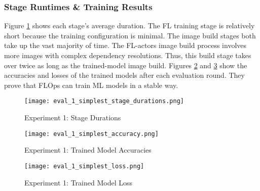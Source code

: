 \subsubsection{Stage Runtimes \& Training Results}
Figure \ref{fig:eval_1_simplest_stage_durations} shows each stage's average duration.
The FL training stage is relatively short because the training configuration is minimal.
The image build stages both take up the vast majority of time.
The FL-actors image build process involves more images with complex dependency resolutions.
Thus, this build stage takes over twice as long as the trained-model image build.
Figures \ref{fig:eval_1_simplest_accuracies} and \ref{fig:eval_1_simplest_loss} show the accuracies and losses of the trained models after each evaluation round.
They prove that FLOps can train ML models in a stable way.

\begin{figure}[H]
    \begin{adjustwidth}{-0.2\paperwidth}{-0.2\paperwidth}
        \centering
        \texttt{[image: eval\_1\_simplest\_stage\_durations.png]}
        \caption{Experiment 1: Stage Durations}
        \label{fig:eval_1_simplest_stage_durations}
    \end{adjustwidth}
\end{figure}

\begin{figure}[H]
    \centering
    \texttt{[image: eval\_1\_simplest\_accuracy.png]}
    \caption{Experiment 1: Trained Model Accuracies}
    \label{fig:eval_1_simplest_accuracies}
\end{figure}

\begin{figure}[H]
    \centering
    \texttt{[image: eval\_1\_simplest\_loss.png]}
    \caption{Experiment 1: Trained Model Loss}
    \label{fig:eval_1_simplest_loss}
\end{figure}

